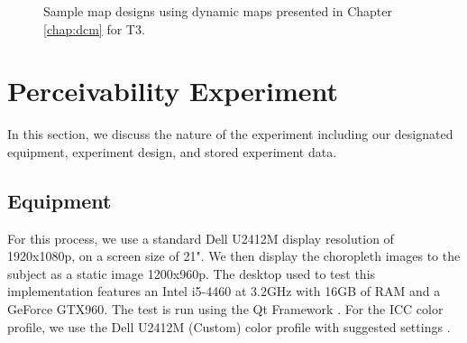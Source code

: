 \begin{figure}[t]
\centering
{} 
\caption{Sample map designs using dynamic maps presented in Chapter \ref{chap:dcm} for T3.} \label{fig:samplet3}
\end{figure}
\section{Perceivability Experiment} \label{sec:experiment}
In this section, we discuss the nature of the experiment including our designated equipment, experiment design, and stored experiment data.
\subsection{Equipment} \label{sec:equipment}
For this process, we use a standard Dell U2412M display resolution of 1920x1080p, on a screen size of 21". We then display the choropleth images to the subject as a static image 1200x960p. The desktop used to test this implementation features an Intel i5-4460 at 3.2GHz with 16GB of RAM and a GeForce GTX960. The test is run using the Qt Framework \cite{Qt}. For the ICC color profile, we use the Dell U2412M (Custom) color profile with suggested settings \cite{icc}.
